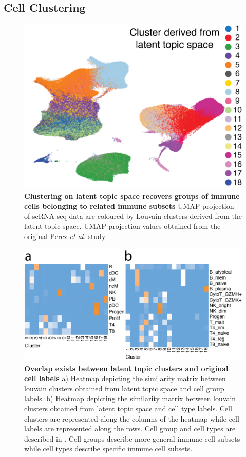 \subsection{Cell Clustering}
\begin{figure}
    \centering
    \includegraphics[width=\textwidth]{Figures/cluster_umap.png}
    \caption{\textbf{Clustering on latent topic space recovers groups of immune cells belonging to related immune subsets} UMAP projection of scRNA-seq data are coloured by Louvain clusters derived from the latent topic space. UMAP projection values obtained from the original Perez \textit{et al.} study \cite{sledata}}
    \label{fig:cluster_umap}
\end{figure}

\begin{figure}
    \centering
    \includegraphics[width=\textwidth]{Figures/cluster_ct.png}
    \caption{\textbf{Overlap exists between latent topic clusters and original cell labels} a) Heatmap depicting the similarity matrix between louvain clusters obtained from latent topic space and cell group labels. b) Heatmap depicting  the similarity matrix between louvain clusters obtained from latent topic space and cell type labels. 
    Cell clusters are represented along the columns of the heatmap while cell labels are represented along the rows. 
    Cell group and cell types are described in \cite{sledata}. Cell groups describe more general immune cell subsets while cell types describe specific immune cell subsets.}
    \label{fig:cluster_ct}
\end{figure}

